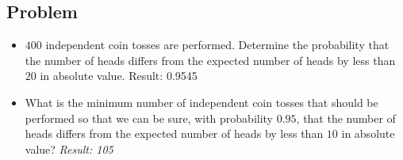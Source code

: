 \documentclass[a4paper, 12pt]{article}
\begin{document}
\subsection{Problem}
\begin{itemize}
\item [a)] $400$ independent coin tosses are performed. Determine the probability that the number of heads differs from the expected number of heads by less than $20$ in absolute value.
Result: {0.9545}
\item [b)] What is the minimum number of independent coin tosses that should be performed so that we can be sure, with probability $0.95$, that the number of heads differs from the expected number of heads by less than $10$ in absolute value?
\textit{Result: {105}}

\end{itemize}
\end{document}
